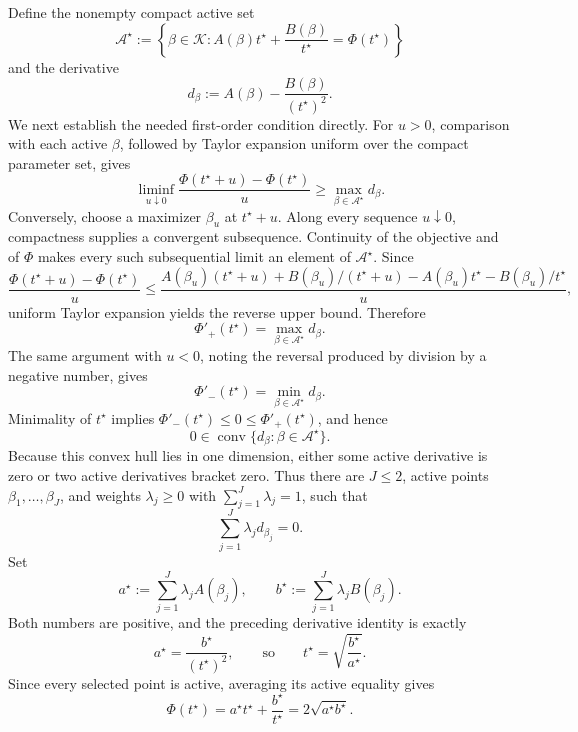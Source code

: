 Define the nonempty compact active set
\[
 \mathcal A^\star
 :=\left\{\beta\in\mathcal K:
 A(\beta)t^\star+\frac{B(\beta)}{t^\star}
 =\Phi(t^\star)\right\}
\]
and the derivative
\[
 d_\beta:=A(\beta)-\frac{B(\beta)}{(t^\star)^2}.
\]
We next establish the needed first-order condition directly.  For \(u>0\), comparison with each active \(\beta\), followed by Taylor expansion uniform over the compact parameter set, gives
\[
 \liminf_{u\downarrow0}
 \frac{\Phi(t^\star+u)-\Phi(t^\star)}{u}
 \ge \max_{\beta\in\mathcal A^\star}d_\beta.
\]
Conversely, choose a maximizer \(\beta_u\) at \(t^\star+u\).  Along every sequence \(u\downarrow0\), compactness supplies a convergent subsequence.  Continuity of the objective and of \(\Phi\) makes every such subsequential limit an element of \(\mathcal A^\star\).  Since
\[
 \frac{\Phi(t^\star+u)-\Phi(t^\star)}{u}
 \le
 \frac{A(\beta_u)(t^\star+u)+B(\beta_u)/(t^\star+u)
       -A(\beta_u)t^\star-B(\beta_u)/t^\star}{u},
\]
uniform Taylor expansion yields the reverse upper bound.  Therefore
\[
 \Phi'_+(t^\star)=\max_{\beta\in\mathcal A^\star}d_\beta.
\]
The same argument with \(u<0\), noting the reversal produced by division by a negative number, gives
\[
 \Phi'_-(t^\star)=\min_{\beta\in\mathcal A^\star}d_\beta.
\]
Minimality of \(t^\star\) implies \(\Phi'_-(t^\star)\le0\le\Phi'_+(t^\star)\), and hence
\[
 0\in\operatorname{conv}
 \{d_\beta:\beta\in\mathcal A^\star\}.
\]
Because this convex hull lies in one dimension, either some active derivative is zero or two active derivatives bracket zero.  Thus there are \(J\le2\), active points \(\beta_1,\ldots,\beta_J\), and weights \(\lambda_j\ge0\) with \(\sum_{j=1}^J\lambda_j=1\), such that
\[
 \sum_{j=1}^J\lambda_jd_{\beta_j}=0.
\]
Set
\[
 a^\star:=\sum_{j=1}^J\lambda_jA(\beta_j),
 \qquad
 b^\star:=\sum_{j=1}^J\lambda_jB(\beta_j).
\]
Both numbers are positive, and the preceding derivative identity is exactly
\[
 a^\star=\frac{b^\star}{(t^\star)^2},
 \qquad\text{so}\qquad
 t^\star=\sqrt{\frac{b^\star}{a^\star}}.
\]
Since every selected point is active, averaging its active equality gives
\[
 \Phi(t^\star)
 =a^\star t^\star+\frac{b^\star}{t^\star}
 =2\sqrt{a^\star b^\star}.
\tag{1}
\]

